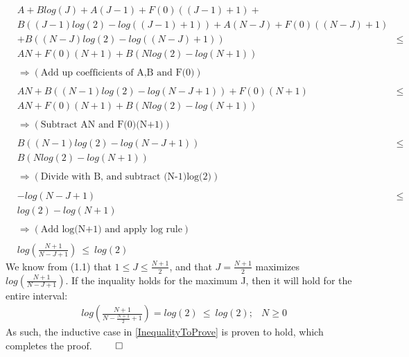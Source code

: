 \begin{equation*}	
\begin{aligned}
&A + Blog(J) + A(J-1) + F(0)((J-1)+1) +                  & \\
&B((J-1)log(2)-log((J-1)+1)) + A(N-J) + F(0)((N-J)+1)    & \\
& + B((N-J)log(2)-log((N-J)+1))                          &\le  \\
&AN + F(0)(N+1) + B(Nlog(2)-log(N+1))                    & \\
& & \\
&\Rightarrow (\text{Add up coefficients of A,B and F(0)})& \\
& & \\
&AN + B((N-1)log(2)-log(N-J+1)) + F(0)(N+1)              &\le \\
&AN + F(0)(N+1) + B(Nlog(2)-log(N+1))                    &  \\	
& & \\
&\Rightarrow (\text{Subtract AN and F(0)(N+1)})          & \\
& & \\	
&B((N-1)log(2)-log(N-J+1))                               &\le \\
&B(Nlog(2)-log(N+1))                                     &  \\	
& & \\
&\Rightarrow (\text{Divide with B, and subtract (N-1)log(2)})      & \\
& & \\
&-log(N-J+1)                                             &\le \\
&log(2)-log(N+1)                                         &  \\	
& & \\
&\Rightarrow (\text{Add log(N+1) and apply log rule})    & \\
& & \\			
&log(\frac{N+1}{N-J+1}) \  \le \  log(2)                 & 	
\end{aligned}
\end{equation*}
We know from (1.1) that $1 \le J \le \frac{N+1}{2}$, and that $J=\frac{N+1}{2}$ maximizes $log(\frac{N+1}{N-J+1})$. If the inquality holds for the maximum J, then it will hold for the entire interval: 
\begin{equation*}	
\begin{aligned}	
&log(\frac{N+1}{N-\frac{N+1}{2}+1}) = log(2) \  \le \  log(2);  & N \ge 0 	
\end{aligned}
\end{equation*}
As such, the inductive case in \ref{InequalityToProve} is proven to hold, which completes the proof. $\qed$











